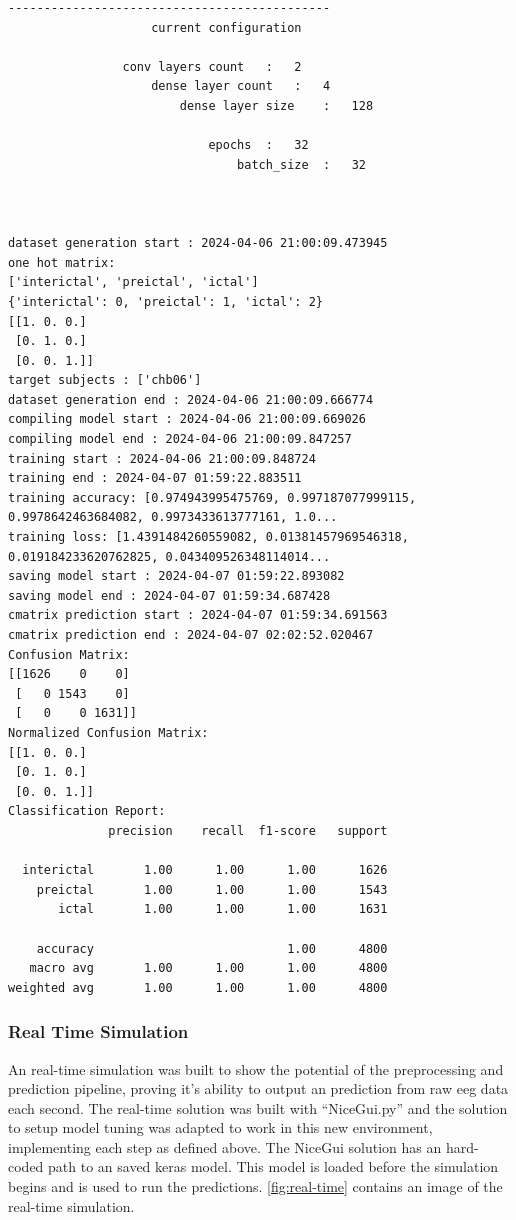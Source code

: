 \documentclass[12pt]{article}
\begin{document}
\begin{lstlisting}[style=logstyle, caption={Logging file programmatically generated during the tuning process. Training accuracy and loss lines have been trimmed for readability.}, label={lst:tuning-metrics}]
       ---------------------------------------------
                    current configuration

                conv layers count   :   2
                    dense layer count   :   4
                        dense layer size    :   128

                            epochs  :   32
                                batch_size  :   32

            
                
dataset generation start : 2024-04-06 21:00:09.473945
one hot matrix:
['interictal', 'preictal', 'ictal']
{'interictal': 0, 'preictal': 1, 'ictal': 2}
[[1. 0. 0.]
 [0. 1. 0.]
 [0. 0. 1.]]
target subjects : ['chb06']
dataset generation end : 2024-04-06 21:00:09.666774
compiling model start : 2024-04-06 21:00:09.669026
compiling model end : 2024-04-06 21:00:09.847257
training start : 2024-04-06 21:00:09.848724
training end : 2024-04-07 01:59:22.883511
training accuracy: [0.974943995475769, 0.997187077999115, 0.9978642463684082, 0.9973433613777161, 1.0...
training loss: [1.4391484260559082, 0.01381457969546318, 0.019184233620762825, 0.043409526348114014...
saving model start : 2024-04-07 01:59:22.893082
saving model end : 2024-04-07 01:59:34.687428
cmatrix prediction start : 2024-04-07 01:59:34.691563
cmatrix prediction end : 2024-04-07 02:02:52.020467
Confusion Matrix:
[[1626    0    0]
 [   0 1543    0]
 [   0    0 1631]]
Normalized Confusion Matrix:
[[1. 0. 0.]
 [0. 1. 0.]
 [0. 0. 1.]]
Classification Report:
              precision    recall  f1-score   support

  interictal       1.00      1.00      1.00      1626
    preictal       1.00      1.00      1.00      1543
       ictal       1.00      1.00      1.00      1631

    accuracy                           1.00      4800
   macro avg       1.00      1.00      1.00      4800
weighted avg       1.00      1.00      1.00      4800
\end{lstlisting}


\subsubsection{Real Time Simulation}

An real-time simulation was built to show the potential of the preprocessing and prediction pipeline, proving it's ability to output an prediction from raw \acrshort{eeg} data each second. The real-time solution was built with ``NiceGui.py'' and the solution to setup model tuning was adapted to work in this new environment, implementing each step as defined above. The NiceGui solution has an hard-coded path to an saved keras model. This model is loaded before the simulation begins and is used to run the predictions. \ref{fig:real-time} contains an image of the real-time simulation. 
\end{document}
